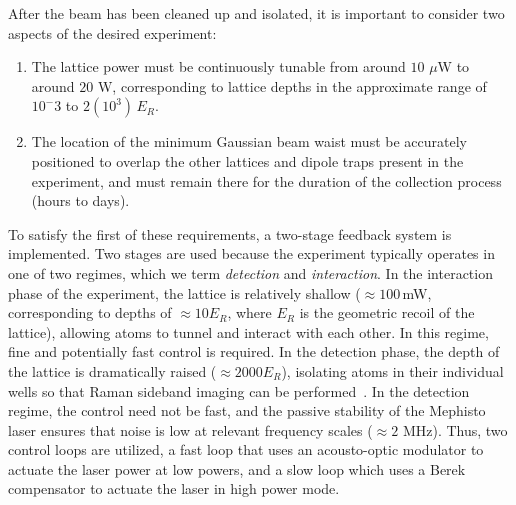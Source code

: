 \documentclass[twocolumn,aps,pra,showpacs,preprintnumbers,bibnotes]{revtex4-1}
\begin{document}
After the beam has been cleaned up and isolated, it is important to consider two aspects of the desired experiment: 
\begin{enumerate}
\item The lattice power must be continuously tunable from around $10$ $\mu$W to around $20$ W, corresponding to lattice depths in the approximate range of $10^-3$ to $2(10^3)\,E_R$. 
\item The location of the minimum Gaussian beam waist must be accurately positioned to overlap the other lattices and dipole traps present in the experiment, and must remain there for the duration of the collection process (hours to days).
\end{enumerate}
To satisfy the first of these requirements, a two-stage feedback system is implemented. 
Two stages are used because the experiment typically operates in one of two regimes, which we term \textit{detection} and \textit{interaction}. 
In the interaction phase of the experiment, the lattice is relatively shallow ($\approx 100\,$mW, corresponding to depths of $\approx 10 E_R$, where $E_R$ is the geometric recoil of the lattice), allowing atoms to tunnel and interact with each other. 
In this regime, fine and potentially fast control is required.
In the detection phase, the depth of the lattice is dramatically raised ($\approx 2000 E_R$), isolating atoms in their individual wells so that Raman sideband imaging can be performed~\cite{Parsons2015}.
In the detection regime, the control need not be fast, and the passive stability of the Mephisto laser ensures that noise is low at relevant frequency scales ($\approx 2$ MHz).
Thus, two control loops are utilized, a fast loop that uses an acousto-optic modulator to actuate the laser power at low powers, and a slow loop which uses a Berek compensator to actuate the laser in high power mode.
\end{document}

